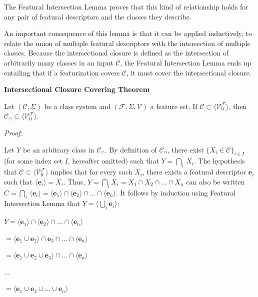 \documentclass[11pt, oneside]{article}   	%
\begin{document}
\noindent The Featural Intersection Lemma proves that this kind of relationship holds for any pair of featural descriptors and the classes they describe.

An important consequence of this lemma is that it can be applied inductively, to relate the union of multiple featural descriptors with the intersection of multiple classes. Because the intersectional closure is defined as the intersection of arbitrarily many classes in an input $\mathcal C$, the Featural Intersection Lemma ends up entailing that if a featurization covers $\mathcal C$, it must cover the intersectional closure.

\vspace{\baselineskip} \noindent \textbf{Intersectional Closure Covering Theorem}

Let $(\mathcal C, \Sigma)$ be a class system and $(\mathcal F, \Sigma, \mathcal V)$ a feature set. If $\mathcal C \subset \langle \mathcal V_0^\mathcal F \rangle$, then $\mathcal C_\cap \subset\langle \mathcal V_0^\mathcal F \rangle $.

\vspace{\baselineskip} \noindent \textit{Proof}:

Let $Y$ be an arbitrary class in $\mathcal C_\cap$. By definition of $\mathcal C_\cap$, there exist $\{X_i \in \mathcal C\}_{i \in I}$ (for some index set $I$, hereafter omitted) such that $Y = \bigcap_i \, X_i$. The hypothesis that $\mathcal C \subset \langle \mathcal V_0^\mathcal F \rangle $ implies that for every such $X_i$, there exists a featural descriptor $\mathbf{e}_i$ such that $\langle \mathbf{e}_i \rangle = X_i$. Thus, $Y = \bigcap_i X_i = X_1 \cap X_2 \cap \ldots \cap X_n$ can also be written $C = \bigcap_i \, \langle \mathbf{e}_i \rangle = \langle \mathbf{e}_1 \rangle \cap \langle \mathbf{e}_2 \rangle \cap \ldots \cap \langle \mathbf{e}_n \rangle$. It follows by induction using Featural Intersection Lemma that $Y = \langle \bigcup_i \mathbf{e}_i \rangle$:

$Y = \langle \mathbf{e}_1 \rangle \cap  \langle \mathbf{e}_2 \rangle \cap \ldots \cap  \langle \mathbf{e}_n \rangle$

\quad $ = \langle \mathbf{e}_1 \cup \mathbf{e}_2 \rangle \cap \mathbf{e}_3 \cap \ldots \cap \langle \mathbf{e}_n \rangle$

\quad $ = \langle \mathbf{e}_1 \cup \mathbf{e}_2 \cup \mathbf{e}_3 \rangle \cap \ldots \cap \langle \mathbf{e}_n \rangle$

\quad $\ldots$

\quad $= \langle \mathbf{e}_1 \cup \mathbf{e}_2 \cup \ldots \cup \mathbf{e}_n \rangle$
\end{document}
